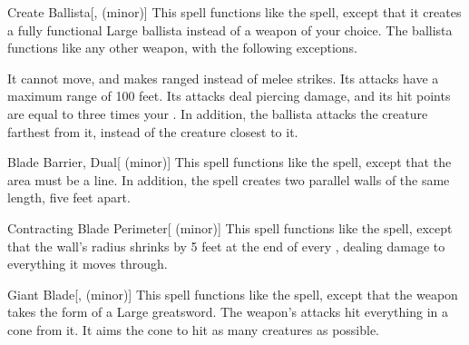 \lowercase{\hypertarget{spell:Create Ballista}{}}\label{spell:Create Ballista}
\begin{apability}[\nth{2}]{\hypertarget{spell:Create Ballista}{Create Ballista}}[,  (minor)]
This spell functions like the  spell, except that it creates a fully functional Large ballista instead of a weapon of your choice.
The ballista functions like any other weapon, with the following exceptions.

It cannot move, and makes ranged  instead of melee strikes.
Its attacks have a maximum range of 100 feet.
Its attacks deal piercing damage, and its hit points are equal to three times your .
In addition, the ballista attacks the creature farthest from it, instead of the creature closest to it.
\end{apability}
\vspace{0.25em}



\lowercase{\hypertarget{spell:Blade Barrier, Dual}{}}\label{spell:Blade Barrier, Dual}
\begin{apability}[\nth{3}]{\hypertarget{spell:Blade Barrier, Dual}{Blade Barrier, Dual}}[ (minor)]
This spell functions like the  spell, except that the area must be a line.
In addition, the spell creates two parallel walls of the same length, five feet apart.
\end{apability}
\vspace{0.25em}



\lowercase{\hypertarget{spell:Contracting Blade Perimeter}{}}\label{spell:Contracting Blade Perimeter}
\begin{apability}[\nth{3}]{\hypertarget{spell:Contracting Blade Perimeter}{Contracting Blade Perimeter}}[ (minor)]
This spell functions like the  spell, except that the wall's radius shrinks by 5 feet at the end of every , dealing damage to everything it moves through.
\end{apability}
\vspace{0.25em}



\lowercase{\hypertarget{spell:Giant Blade}{}}\label{spell:Giant Blade}
\begin{apability}[\nth{3}]{\hypertarget{spell:Giant Blade}{Giant Blade}}[,  (minor)]
This spell functions like the  spell, except that the weapon takes the form of a Large greatsword.
The weapon's attacks hit everything in a \areasmall cone from it.
It aims the cone to hit as many creatures as possible.
\end{apability}
\vspace{0.25em}



